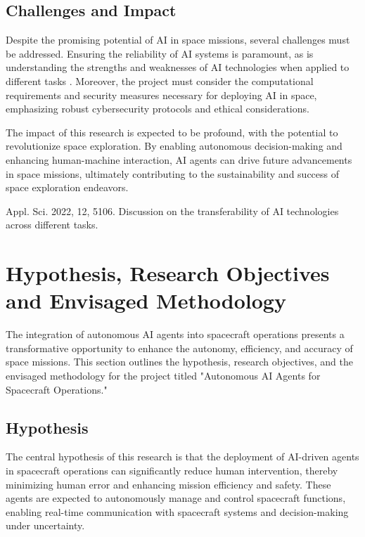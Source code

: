 \documentclass[a4paper,12pt]{article}
\begin{document}
\subsection{Challenges and Impact}

Despite the promising potential of AI in space missions, several challenges must be addressed. Ensuring the reliability of AI systems is paramount, as is understanding the strengths and weaknesses of AI technologies when applied to different tasks \cite{AITransferIssues}. Moreover, the project must consider the computational requirements and security measures necessary for deploying AI in space, emphasizing robust cybersecurity protocols and ethical considerations.

The impact of this research is expected to be profound, with the potential to revolutionize space exploration. By enabling autonomous decision-making and enhancing human-machine interaction, AI agents can drive future advancements in space missions, ultimately contributing to the sustainability and success of space exploration endeavors.

\begin{thebibliography}{9}
     Appl. Sci. 2022, 12, 5106.
     Discussion on the transferability of AI technologies across different tasks.
\end{thebibliography}



\section{Hypothesis, Research Objectives and Envisaged Methodology}

The integration of autonomous AI agents into spacecraft operations presents a transformative opportunity to enhance the autonomy, efficiency, and accuracy of space missions. This section outlines the hypothesis, research objectives, and the envisaged methodology for the project titled "Autonomous AI Agents for Spacecraft Operations."

\subsection{Hypothesis}

The central hypothesis of this research is that the deployment of AI-driven agents in spacecraft operations can significantly reduce human intervention, thereby minimizing human error and enhancing mission efficiency and safety. These agents are expected to autonomously manage and control spacecraft functions, enabling real-time communication with spacecraft systems and decision-making under uncertainty.
\end{document}
